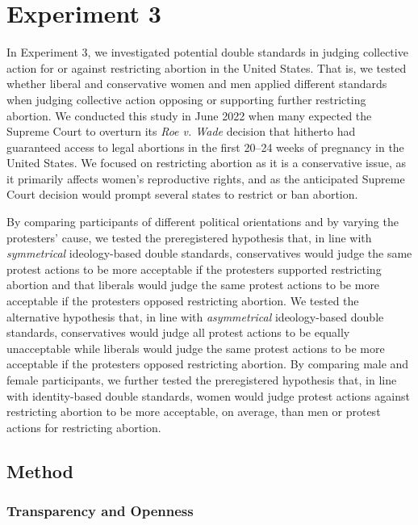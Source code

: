 \documentclass[12pt, letterpaper]{article}
\begin{document}
\hypertarget{experiment-3}{%
\section{Experiment 3}\label{experiment-3}}

In Experiment 3, we investigated potential double standards in judging
collective action for or against restricting abortion in the United
States. That is, we tested whether liberal and conservative women and
men applied different standards when judging collective action opposing
or supporting further restricting abortion. We conducted this study in
June 2022 when many expected the Supreme Court to overturn its \emph{Roe
v. Wade} decision that hitherto had guaranteed access to legal abortions
in the first 20--24 weeks of pregnancy in the United States. We focused
on restricting abortion as it is a conservative issue, as it primarily
affects women's reproductive rights, and as the anticipated Supreme
Court decision would prompt several states to restrict or ban abortion.

By comparing participants of different political orientations and by
varying the protesters' cause, we tested the preregistered hypothesis
that, in line with \emph{symmetrical} ideology-based double standards,
conservatives would judge the same protest actions to be more acceptable
if the protesters supported restricting abortion and that liberals would
judge the same protest actions to be more acceptable if the protesters
opposed restricting abortion. We tested the alternative hypothesis that,
in line with \emph{asymmetrical} ideology-based double standards,
conservatives would judge all protest actions to be equally unacceptable
while liberals would judge the same protest actions to be more
acceptable if the protesters opposed restricting abortion. By comparing
male and female participants, we further tested the preregistered
hypothesis that, in line with identity-based double standards, women
would judge protest actions against restricting abortion to be more
acceptable, on average, than men or protest actions for restricting
abortion.

\hypertarget{method-2}{%
\subsection{Method}\label{method-2}}

\hypertarget{transparency-and-openness-2}{%
\subsubsection{Transparency and
Openness}\label{transparency-and-openness-2}}
\end{document}
